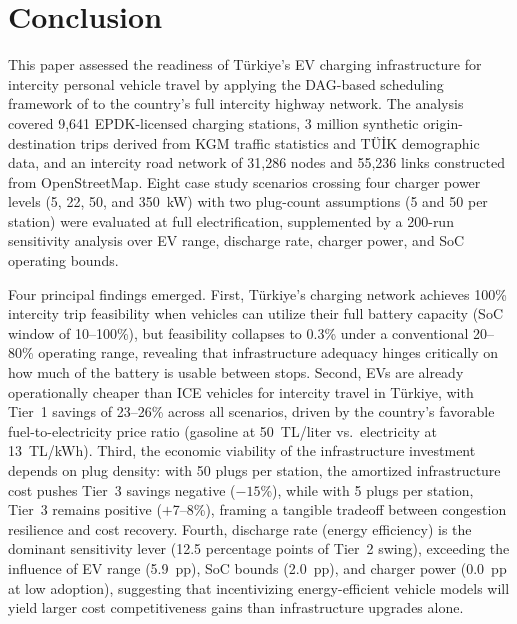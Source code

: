 \section{Conclusion}\label{sec:conclusion}

This paper assessed the readiness of T\"{u}rkiye's EV charging infrastructure for intercity personal vehicle travel by applying the DAG-based scheduling framework of \citet{cokyasar2026electrification} to the country's full intercity highway network. The analysis covered 9,641 EPDK-licensed charging stations, 3 million synthetic origin-destination trips derived from KGM traffic statistics and T\"{U}\.{I}K demographic data, and an intercity road network of 31,286 nodes and 55,236 links constructed from OpenStreetMap. Eight case study scenarios crossing four charger power levels (5, 22, 50, and 350~kW) with two plug-count assumptions (5 and 50 per station) were evaluated at full electrification, supplemented by a 200-run sensitivity analysis over EV range, discharge rate, charger power, and SoC operating bounds.

Four principal findings emerged. First, T\"{u}rkiye's charging network achieves 100\% intercity trip feasibility when vehicles can utilize their full battery capacity (SoC window of 10--100\%), but feasibility collapses to 0.3\% under a conventional 20--80\% operating range, revealing that infrastructure adequacy hinges critically on how much of the battery is usable between stops. Second, EVs are already operationally cheaper than ICE vehicles for intercity travel in T\"{u}rkiye, with Tier~1 savings of 23--26\% across all scenarios, driven by the country's favorable fuel-to-electricity price ratio (gasoline at 50~TL/liter vs.\ electricity at 13~TL/kWh). Third, the economic viability of the infrastructure investment depends on plug density: with 50 plugs per station, the amortized infrastructure cost pushes Tier~3 savings negative ($-15$\%), while with 5 plugs per station, Tier~3 remains positive ($+$7--8\%), framing a tangible tradeoff between congestion resilience and cost recovery. Fourth, discharge rate (energy efficiency) is the dominant sensitivity lever (12.5 percentage points of Tier~2 swing), exceeding the influence of EV range (5.9~pp), SoC bounds (2.0~pp), and charger power (0.0~pp at low adoption), suggesting that incentivizing energy-efficient vehicle models will yield larger cost competitiveness gains than infrastructure upgrades alone.

